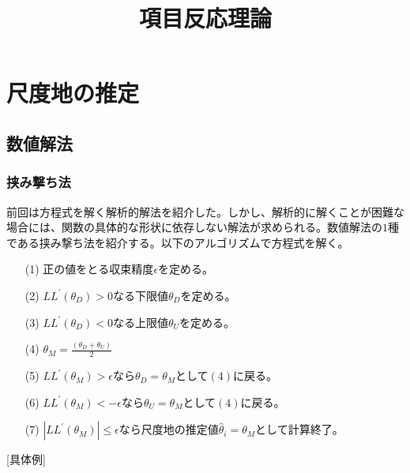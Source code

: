 \documentclass[12pt]{jarticle}
\title{項目反応理論}
\begin{document}
\maketitle
\setcounter{section}{2}

\section{尺度地の推定}
\setcounter{subsection}{2}
\subsection{数値解法}
\setcounter{subsubsection}{1}
\subsubsection{挟み撃ち法}
前回は方程式を解く解析的解法を紹介した。しかし、解析的に解くことが困難な場合には、関数の具体的な形状に依存しない解法が求められる。数値解法の$1$種である挟み撃ち法を紹介する。以下のアルゴリズムで方程式を解く。
\begin{itemize}
  \item[(1)] 正の値をとる収束精度$\displaystyle\epsilon$を定める。
  \item[(2)] $LL^{\prime}(\theta_D) > 0$なる下限値$\displaystyle\theta_D$を定める。
  \item[(3)] $LL^{\prime}(\theta_D) < 0$なる上限値$\displaystyle\theta_U$を定める。
  \item[(4)] $\displaystyle \theta_M = \frac{(\theta_D + \theta_U )}{2}$
  \item[(5)] $\displaystyle LL^{\prime}(\theta_M) > \epsilon$なら$\displaystyle\theta_D=\theta_M$として$(4)$に戻る。
  \item[(6)]  $\displaystyle LL^{\prime}(\theta_M) < -\epsilon$なら$\displaystyle\theta_U=\theta_M$として$(4)$に戻る。
  \item[(7)] $\displaystyle |LL^{\prime}(\theta_M)| \leq \epsilon$なら尺度地の推定値$\hat{\theta}_i = \theta_M$として計算終了。
\end{itemize}
[具体例]
\end{document}
